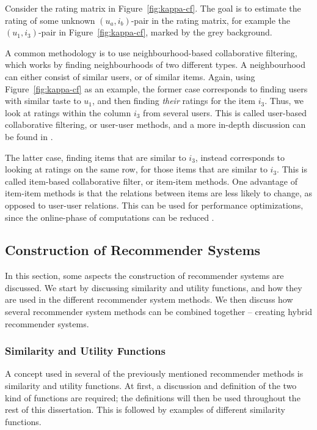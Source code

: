 Consider the rating matrix in Figure~\ref{fig:kappa-cf}.
The goal is to estimate the rating of some unknown $(u_a, i_b)$-pair in the rating matrix, for example the $(u_1, i_3)$-pair in Figure~\ref{fig:kappa-cf}, marked by the grey background.

A common methodology is to use neighbourhood-based collaborative filtering, which works by finding neighbourhoods of two different types.
A neighbourhood can either consist of similar users, or of similar items.
Again, using Figure~\ref{fig:kappa-cf} as an example, the former case corresponds to finding users with similar taste to $u_1$, and then finding \emph{their} ratings for the item $i_3$.
Thus, we look at ratings within the column $i_3$ from several users.
This is called user-based collaborative filtering, or user-user methods, and a more in-depth discussion can be found in \cite{herlocker:1999}.

The latter case, finding items that are similar to $i_3$, instead corresponds to looking at ratings on the same row, for those items that are similar to $i_3$.
This is called item-based collaborative filter, or item-item methods.
One advantage of item-item methods is that the relations between items are less likely to change, as opposed to user-user relations.
This can be used for performance optimizations, since the online-phase of computations can be reduced \cite{sarwar:2001}.

\subsection{Construction of Recommender Systems}

In this section, some aspects the construction of recommender systems are discussed.
We start by discussing similarity and utility functions, and how they are used in the different recommender system methods.
We then discuss how several recommender system methods can be combined together -- creating hybrid recommender systems.

\subsubsection{Similarity and Utility Functions}

A concept used in several of the previously mentioned recommender methods is similarity and utility functions.
At first, a discussion and definition of the two kind of functions are required; the definitions will then be used throughout the rest of this dissertation.
This is followed by examples of different similarity functions.

